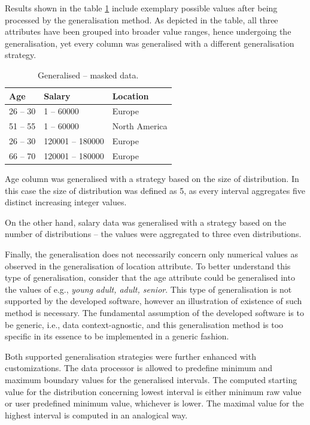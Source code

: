 \documentclass[a4paper,twoside,12pt]{book}
\begin{document}
Results shown in the table \ref{id:tab:generalisation} include exemplary possible values after being processed by the generalisation method. As depicted in the table, all three attributes have been grouped into broader value ranges, hence undergoing the generalisation, yet every column was generalised with a different generalisation strategy.

\begin{table}[h]
\centering
\caption{Generalised – masked data.}
\label{id:tab:generalisation}
\begin{tabular}{lll}
\toprule
Age   & Salary          & Location      \\ \midrule
26 – 30 & 1 – 60000       & Europe        \\
51 – 55 & 1 – 60000       & North America \\
26 – 30 & 120001 – 180000 & Europe        \\
66 – 70 & 120001 – 180000 & Europe        \\ \bottomrule
\end{tabular}
\end{table}

Age column was generalised with a strategy based on the size of distribution. In this case the size of distribution was defined as 5, as every interval aggregates five distinct increasing integer values.

On the other hand, salary data was generalised with a strategy based on the number of distributions – the values were aggregated to three even distributions.

Finally, the generalisation does not necessarily concern only numerical values as observed in the generalisation of location attribute. To better understand this type of generalisation, consider that the age attribute could be generalised into the values of e.g., \textit{young adult, adult, senior}. This type of generalisation is not supported by the developed software, however an illustration of existence of such method is necessary. The fundamental assumption of the developed software is to be generic, i.e., data context-agnostic, and this generalisation method is too specific in its essence to be implemented in a generic fashion.

Both supported generalisation strategies were further enhanced with customizations. The data processor is allowed to predefine minimum and maximum boundary values for the generalised intervals. The computed starting value for the distribution concerning lowest interval is either minimum raw value or user predefined minimum value, whichever is lower. The maximal value for the highest interval is computed in an analogical way.
\end{document}
